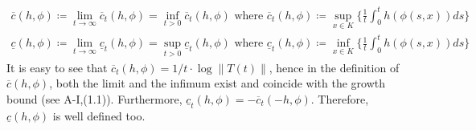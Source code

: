 \begin{equation}\label{eq:b3-4.4}
	\begin{aligned}
		\text{$\overline{c}(h,\phi) \coloneq \lim_{t\to\infty} \overline{c}_{t}(h,\phi) = \inf_{t>0} \overline{c}_{t}(h,\phi)$  where  
		$\overline{c}_{t}(h,\phi) \coloneq \sup_{x\in K} \{\frac{1}{t}\int_{0}^{t} h(\phi(s,x)) ds\}$ }\\
		\text{$\underline{c}(h,\phi) \coloneq \lim_{t\to\infty} \underline{c}_{t}(h,\phi) = \sup_{t>0} \underline{c}_{t}(h,\phi)$  where 
		$\underline{c}_{t}(h,\phi) \coloneq \inf_{x\in K} \{\frac{1}{t}\int_{0}^{t} h(\phi(s,x)) ds\}$}
	\end{aligned}
\end{equation}
It is easy to see that $\overline{c}_{t}(h,\phi) = 1/t\cdot\log\|T(t)\|$, hence in the definition of $\overline{c}(h,\phi)$, both the limit and the infimum exist and coincide with the growth bound (see A-I,(1.1)).
Furthermore, $\underline{c}_{t}(h,\phi) = -\overline{c}_{t}(-h,\phi)$.
Therefore, $\underline{c}(h,\phi)$ is well defined too.

